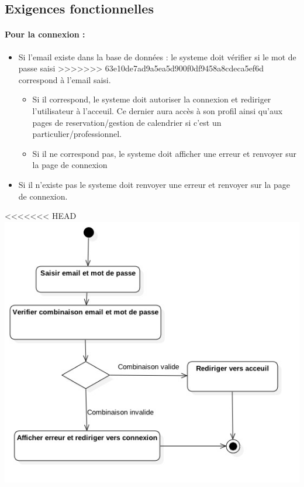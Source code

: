 \documentclass{article}
\begin{document}
\begin{itemize}
\begin{itemize}
\subsection{Exigences fonctionnelles}
\paragraph{Pour la connexion : }

\begin{itemize}
\item Si l'email existe dans la base de données :
	le systeme doit vérifier si le mot de passe saisi
>>>>>>> 63e10de7ad9a5ea5d900f0df9458a8cdeca5ef6d
	correspond à l'email saisi.
		\begin{itemize}
		\item Si il correspond, le systeme doit autoriser la connexion et
			rediriger l'utilisateur à l'acceuil. Ce dernier aura accès à son
			profil ainsi qu'aux pages de reservation/gestion de calendrier
			si c'est un particulier/professionnel.
		\item Si il ne correspond pas, le systeme doit afficher une erreur
			et renvoyer sur la page de connexion
		\end{itemize}
\item Si il n'existe pas le systeme doit renvoyer une erreur
	et renvoyer sur la page de connexion.
\end{itemize}

<<<<<<< HEAD
\includegraphics[scale=0.6]{ShematDiagrammes/activiteConnexion.jpg}


\end{itemize}
\end{itemize}
\end{document}
